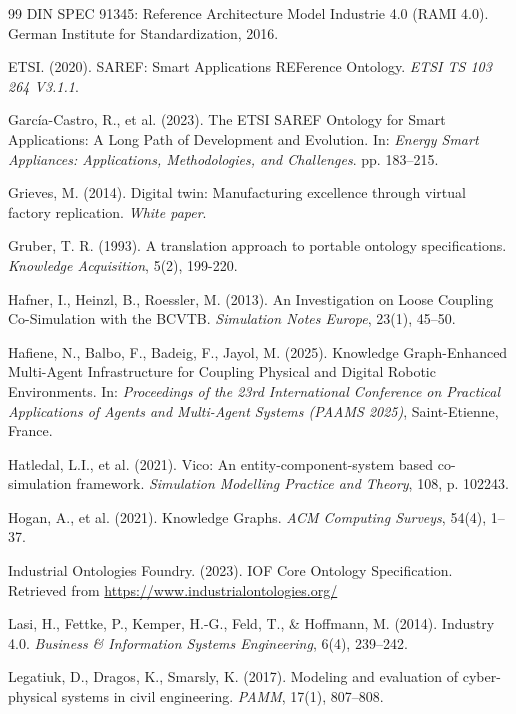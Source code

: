 \documentclass{article} %
\begin{document}
\begin{thebibliography}{99}
DIN SPEC 91345: Reference Architecture Model Industrie 4.0 (RAMI 4.0). German Institute for Standardization, 2016.

ETSI. (2020). SAREF: Smart Applications REFerence Ontology. \emph{ETSI TS 103 264 V3.1.1}.

García-Castro, R., et al. (2023). The ETSI SAREF Ontology for Smart Applications: A Long Path of Development and Evolution. In: \emph{Energy Smart Appliances: Applications, Methodologies, and Challenges}. pp. 183–215.

Grieves, M. (2014). Digital twin: Manufacturing excellence through virtual factory replication. \emph{White paper}.

Gruber, T. R. (1993). A translation approach to portable ontology specifications. \emph{Knowledge Acquisition}, 5(2), 199-220.

Hafner, I., Heinzl, B., Roessler, M. (2013). An Investigation on Loose Coupling Co-Simulation with the BCVTB. \emph{Simulation Notes Europe}, 23(1), 45–50.

Hafiene, N., Balbo, F., Badeig, F., Jayol, M. (2025). Knowledge Graph-Enhanced Multi-Agent Infrastructure for Coupling Physical and Digital Robotic Environments. In: \emph{Proceedings of the 23rd International Conference on Practical Applications of Agents and Multi-Agent Systems (PAAMS 2025)}, Saint-Etienne, France.

Hatledal, L.I., et al. (2021). Vico: An entity-component-system based co-simulation framework. \emph{Simulation Modelling Practice and Theory}, 108, p. 102243.

Hogan, A., et al. (2021). Knowledge Graphs. \emph{ACM Computing Surveys}, 54(4), 1–37.

Industrial Ontologies Foundry. (2023). IOF Core Ontology Specification. Retrieved from \url{https://www.industrialontologies.org/ }

Lasi, H., Fettke, P., Kemper, H.-G., Feld, T., \& Hoffmann, M. (2014). Industry 4.0. \emph{Business \& Information Systems Engineering}, 6(4), 239--242.

Legatiuk, D., Dragos, K., Smarsly, K. (2017). Modeling and evaluation of cyber-physical systems in civil engineering. \emph{PAMM}, 17(1), 807–808.


\end{thebibliography}
\end{document}
